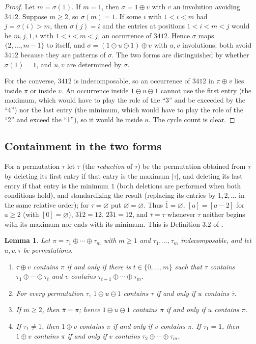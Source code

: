 \documentclass[11pt]{amsart}
\newtheorem{lemma}[theorem]{Lemma}
\theoremstyle{definition}
\newcommand{\ds}{\oplus}
\newcommand{\sk}{\ominus}
\newcommand{\red}[1]{\overline{#1}}
\begin{document}
\begin{proof}
Let $m=\sigma(1)$. If $m=1$, then $\sigma=1\ds v$ with $v$ an involution avoiding $3412$. Suppose $m\ge2$, so $\sigma(m)=1$. If some $i$ with $1<i<m$ had $j=\sigma(i)>m$, then $\sigma(j)=i$ and the entries at positions $1<i<m<j$ would be $m,j,1,i$ with $1<i<m<j$, an occurrence of $3412$. Hence $\sigma$ maps $\{2,\dots,m-1\}$ to itself, and $\sigma=(1\sk u\sk1)\ds v$ with $u,v$ involutions; both avoid $3412$ because they are patterns of $\sigma$. The two forms are distinguished by whether $\sigma(1)=1$, and $u,v$ are determined by $\sigma$.

For the converse, $3412$ is indecomposable, so an occurrence of $3412$ in $\pi\ds v$ lies inside $\pi$ or inside $v$. An occurrence inside $1\sk u\sk1$ cannot use the first entry (the maximum, which would have to play the role of the ``3'' and be exceeded by the ``4'') nor the last entry (the minimum, which would have to play the role of the ``2'' and exceed the ``1''), so it would lie inside $u$. The cycle count is clear.
\end{proof}

\subsection{Containment in the two forms}
For a permutation $\tau$ let $\red\tau$ (the \emph{reduction} of $\tau$) be the permutation obtained from $\tau$ by deleting its first entry if that entry is the maximum $|\tau|$, and deleting its last entry if that entry is the minimum $1$ (both deletions are performed when both conditions hold), and standardizing the result (replacing its entries by $1,2,\dots$ in the same relative order); for $\tau=\varnothing$ put $\red\varnothing=\varnothing$. Thus $\red1=\varnothing$, $\red{[a]}=[a-2]$ for $a\ge2$ (with $[0]=\varnothing$), $\red{312}=12$, $\red{231}=12$, and $\red\tau=\tau$ whenever $\tau$ neither begins with its maximum nor ends with its minimum. This is Definition 3.2 of \cite{EggeMansour2006}.

\begin{lemma}\label{lem:layers}
Let $\pi=\tau_1\ds\cdots\ds\tau_m$ with $m\ge1$ and $\tau_1,\dots,\tau_m$ indecomposable, and let $u,v,\tau$ be permutations.
\begin{enumerate}
\item[(a)] $\tau\ds v$ contains $\pi$ if and only if there is $t\in\{0,\dots,m\}$ such that $\tau$ contains $\tau_1\ds\cdots\ds\tau_t$ and $v$ contains $\tau_{t+1}\ds\cdots\ds\tau_m$.
\item[(b)] For every permutation $\tau$, $1\sk u\sk1$ contains $\tau$ if and only if $u$ contains $\red\tau$.
\item[(c)] If $m\ge2$, then $\red\pi=\pi$; hence $1\sk u\sk1$ contains $\pi$ if and only if $u$ contains $\pi$.
\item[(d)] If $\tau_1\ne1$, then $1\ds v$ contains $\pi$ if and only if $v$ contains $\pi$. If $\tau_1=1$, then $1\ds v$ contains $\pi$ if and only if $v$ contains $\tau_2\ds\cdots\ds\tau_m$.
\end{enumerate}
\end{lemma}
\end{document}
